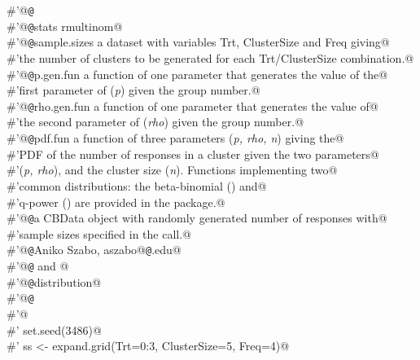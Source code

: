 \documentclass[reqno]{amsart}
\begin{document}
\begin{flushleft}
\begin{list}{}{}
\mbox{}\verb@#'@{\tt @}\verb@export@\\
\mbox{}\verb@#'@{\tt @}\verb@importFrom stats rmultinom@\\
\mbox{}\verb@#'@{\tt @}\verb@param sample.sizes a dataset with variables Trt, ClusterSize and Freq giving@\\
\mbox{}\verb@#'the number of clusters to be generated for each Trt/ClusterSize combination.@\\
\mbox{}\verb@#'@{\tt @}\verb@param p.gen.fun a function of one parameter that generates the value of the@\\
\mbox{}\verb@#'first parameter of  (\emph{p}) given the group number.@\\
\mbox{}\verb@#'@{\tt @}\verb@param rho.gen.fun a function of one parameter that generates the value of@\\
\mbox{}\verb@#'the second parameter of  (\emph{rho}) given the group number.@\\
\mbox{}\verb@#'@{\tt @}\verb@param pdf.fun a function of three parameters (\emph{p, rho, n}) giving the@\\
\mbox{}\verb@#'PDF of the number of responses in a cluster given the two parameters@\\
\mbox{}\verb@#'(\emph{p, rho}), and the cluster size (\emph{n}). Functions implementing two@\\
\mbox{}\verb@#'common distributions: the beta-binomial () and@\\
\mbox{}\verb@#'q-power () are provided in the package.@\\
\mbox{}\verb@#'@{\tt @}\verb@return a CBData object with randomly generated number of responses with@\\
\mbox{}\verb@#'sample sizes specified in the call.@\\
\mbox{}\verb@#'@{\tt @}\verb@author Aniko Szabo, aszabo@{\tt @}\verb@mcw.edu@\\
\mbox{}\verb@#'@{\tt @}\verb@seealso {} and @\\
\mbox{}\verb@#'@{\tt @}\verb@keywords distribution@\\
\mbox{}\verb@#'@{\tt @}\verb@examples@\\
\mbox{}\verb@#'@\\
\mbox{}\verb@#' set.seed(3486)@\\
\mbox{}\verb@#' ss <- expand.grid(Trt=0:3, ClusterSize=5, Freq=4)@\\

\end{list}
\end{flushleft}
\end{document}
